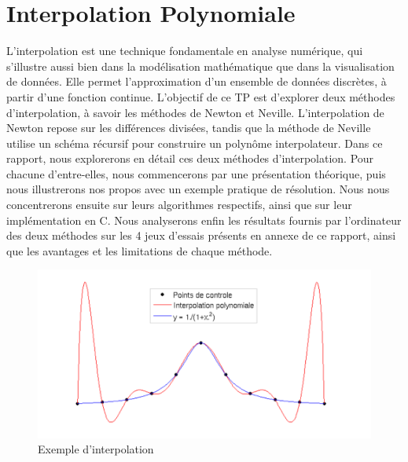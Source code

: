 \chapter{Interpolation Polynomiale}
L'interpolation est une technique fondamentale en analyse numérique, qui s'illustre aussi bien dans la modélisation mathématique que dans la visualisation de données. Elle permet l'approximation d'un ensemble de données discrètes, à partir d'une fonction continue. L'objectif de ce TP est d'explorer deux méthodes d'interpolation, à savoir les méthodes de Newton et Neville. L'interpolation de Newton repose sur les différences divisées, tandis que la méthode de Neville utilise un schéma récursif pour construire un polynôme interpolateur. 
Dans ce rapport, nous explorerons en détail ces deux méthodes d'interpolation. Pour chacune d'entre-elles, nous commencerons par une présentation théorique, puis nous illustrerons nos propos avec un exemple pratique de résolution. Nous nous concentrerons ensuite sur leurs algorithmes respectifs, ainsi que sur leur implémentation en C. Nous analyserons enfin les résultats fournis par l'ordinateur des deux méthodes sur les 4 jeux d'essais présents en annexe de ce rapport, ainsi que les avantages et les limitations de chaque méthode.
\begin{figure}[h]
    \centering
    \includegraphics[width=1\textwidth]{chapter/interpolation.png}
    \caption{Exemple d'interpolation}
\end{figure}
\newpage

